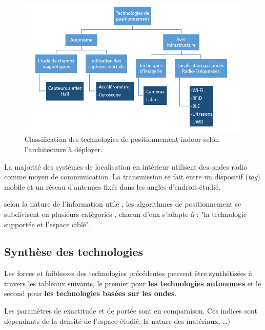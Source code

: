 \documentclass[12pt,a4paper]{report}
\begin{document}
	\begin{figure}[H]
	\centering
	\includegraphics[width=1\linewidth]{Pics/techniques.PNG}
	\caption{Classification des technologies de positionnement indoor selon l’architecture à déployer.}
	\label{fig:techniques}
	
\end{figure}

La majorité des systèmes de localisation en intérieur utilisent des ondes radio comme moyen de communication. La transmission se fait entre un dispositif (\textit{tag}) mobile et un réseau d’antennes fixés dans les angles d’endroit étudié.

selon la nature de l’information utile , les algorithmes de positionnement se subdivisent en plusieurs catégories , chacun d'eux s'adapte à : "la technologie supportée et l'espace ciblé".


\subsection{Synthèse des technologies}

Les forces et faiblesses des technologies précédentes peuvent être synthétisées à travers les tableaux suivants, le premier pour\textbf{ les technologies autonomes} et le second pour \textbf{les technologies basées sur les ondes}. 

Les paramètres de exactitude et de portée sont en comparaison. Ces indices sont dépendants de la densité de l’espace étudié, la nature des matériaux, …)
\end{document}
